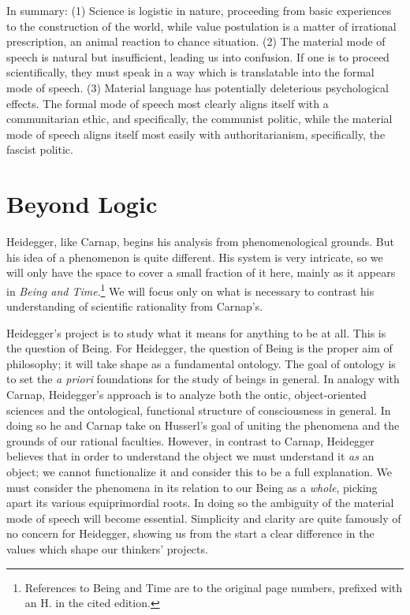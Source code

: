 \documentclass[leqno, 12pt]{turabian-researchpaper}
\begin{document}
	In summary: (1) Science is logistic in nature, proceeding from basic
	experiences to the construction of the world, while value postulation is a matter
	of irrational prescription, an animal reaction to chance situation. (2) The material
	mode of speech is natural but insufficient, leading us into confusion. If one is
	to proceed scientifically, they must speak in a way which is translatable into
	the formal mode of speech. (3) Material language has potentially deleterious psychological
	effects. The formal mode of speech most clearly aligns itself with a
	communitarian ethic, and specifically, the communist politic, while the material
	mode of speech aligns itself most easily with authoritarianism, specifically, the
	fascist politic.

	\section{Beyond Logic}

	Heidegger, like Carnap, begins his analysis from phenomenological grounds. But
	his idea of a phenomenon is quite different. His system is very intricate, so we
	will only have the space to cover a small fraction of it here, mainly as it
	appears in \textit{Being and Time}.\footnote{References to Being and Time are
	to the original page numbers, prefixed with an H. in the cited edition.} We will
	focus only on what is necessary to contrast his understanding of scientific rationality
	from Carnap's.

	Heidegger's project is to study what it means for anything to be at all. This
	is the question of Being. For Heidegger, the question of Being is the proper
	aim of philosophy; it will take shape as a fundamental ontology. The goal of
	ontology is to set the \textit{a priori} foundations for the study of beings in
	general. In analogy with Carnap, Heidegger's approach is to analyze both the ontic,
	object-oriented sciences and the ontological, functional structure of consciousness
	in general. In doing so he and Carnap take on Husserl's goal of uniting the
	phenomena and the grounds of our rational faculties. However, in contrast to
	Carnap, Heidegger believes that in order to understand the object we must understand
	it \emph{as} an object; we cannot functionalize it and consider this to be a full
	explanation. We must consider the phenomena in its relation to our Being as a
	\emph{whole}, picking apart its various equiprimordial roots. In doing so the ambiguity
	of the material mode of speech will become essential. Simplicity and clarity
	are quite famously of no concern for Heidegger, showing us from the start a clear
	difference in the values which shape our thinkers' projects.
\end{document}
